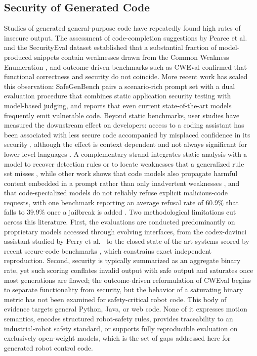 \documentclass{ieeeaccess}
\begin{document}
\subsection{Security of Generated Code}
Studies of generated general-purpose code have repeatedly found high rates of
insecure output. The assessment of code-completion suggestions by Pearce et al.\
\cite{ref5} and the SecurityEval dataset \cite{ref6} established that a substantial
fraction of model-produced snippets contain weaknesses drawn from the Common
Weakness Enumeration \cite{ref65}, and outcome-driven benchmarks such as CWEval \cite{ref7}
confirmed that functional correctness and security do not coincide. More recent
work has scaled this observation: SafeGenBench \cite{ref21} pairs a scenario-rich
prompt set with a dual evaluation procedure that combines static application
security testing with model-based judging, and reports that even current
state-of-the-art models frequently emit vulnerable code. Beyond static benchmarks,
user studies have measured the downstream effect on developers: access to a coding
assistant has been associated with less secure code accompanied by misplaced
confidence in its security \cite{ref22}, although the effect is context dependent
and not always significant for lower-level languages \cite{ref23}. A complementary
strand integrates static analysis with a model to recover detection rules or to
locate weaknesses that a generalized rule set misses \cite{ref24, ref25}, while
other work shows that code models also propagate harmful content embedded in a
prompt rather than only inadvertent weaknesses \cite{ref26}, and that
code-specialized models do not reliably refuse explicit malicious-code requests, with one
benchmark reporting an average refusal rate of 60.9\% that falls to 39.9\% once a jailbreak is added \cite{ref27}. Two methodological limitations cut
across this literature. First, the evaluations are conducted predominantly on
proprietary models accessed through evolving interfaces, from the codex-davinci
assistant studied by Perry et al.\ \cite{ref22} to the closed state-of-the-art
systems scored by recent secure-code benchmarks \cite{ref7, ref21}, which
constrains exact independent reproduction. Second, security is typically summarized
as an aggregate binary rate, yet such scoring conflates invalid output with safe
output and saturates once most generations are flawed; the outcome-driven
reformulation of CWEval \cite{ref7} begins to separate functionality from security,
but the behavior of a saturating binary metric has not been examined for
safety-critical robot code. This body of evidence targets general Python, Java, or
web code. None of it expresses motion semantics, encodes structured robot-safety
rules, provides traceability to an industrial-robot safety standard, or supports
fully reproducible evaluation on exclusively open-weight models, which is the set of gaps
addressed here for generated robot control code.
\end{document}
